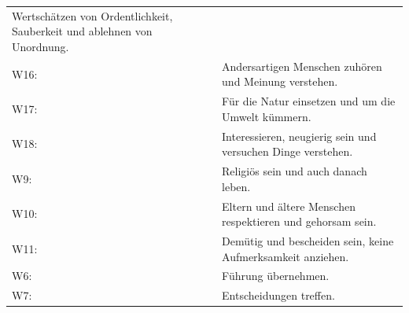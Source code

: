 \documentclass[12pt,ngerman,]{book}
\begin{document}
\begin{longtable}[]{@{}ll@{}}
\begin{minipage}[t]{0.86\columnwidth}
Wertschätzen von Ordentlichkeit, Sauberkeit und ablehnen von
Unordnung.\strut
\end{minipage}\tabularnewline
\begin{minipage}[t]{0.08\columnwidth}\raggedright\strut
W16:\strut
\end{minipage} & \begin{minipage}[t]{0.86\columnwidth}\raggedright\strut
Andersartigen Menschen zuhören und Meinung verstehen.\strut
\end{minipage}\tabularnewline
\begin{minipage}[t]{0.08\columnwidth}\raggedright\strut
W17:\strut
\end{minipage} & \begin{minipage}[t]{0.86\columnwidth}\raggedright\strut
Für die Natur einsetzen und um die Umwelt kümmern.\strut
\end{minipage}\tabularnewline
\begin{minipage}[t]{0.08\columnwidth}\raggedright\strut
W18:\strut
\end{minipage} & \begin{minipage}[t]{0.86\columnwidth}\raggedright\strut
Interessieren, neugierig sein und versuchen Dinge verstehen.\strut
\end{minipage}\tabularnewline
\begin{minipage}[t]{0.08\columnwidth}\raggedright\strut
W9:\strut
\end{minipage} & \begin{minipage}[t]{0.86\columnwidth}\raggedright\strut
Religiös sein und auch danach leben.\strut
\end{minipage}\tabularnewline
\begin{minipage}[t]{0.08\columnwidth}\raggedright\strut
W10:\strut
\end{minipage} & \begin{minipage}[t]{0.86\columnwidth}\raggedright\strut
Eltern und ältere Menschen respektieren und gehorsam sein.\strut
\end{minipage}\tabularnewline
\begin{minipage}[t]{0.08\columnwidth}\raggedright\strut
W11:\strut
\end{minipage} & \begin{minipage}[t]{0.86\columnwidth}\raggedright\strut
Demütig und bescheiden sein, keine Aufmerksamkeit anziehen.\strut
\end{minipage}\tabularnewline
\begin{minipage}[t]{0.08\columnwidth}\raggedright\strut
W6:\strut
\end{minipage} & \begin{minipage}[t]{0.86\columnwidth}\raggedright\strut
Führung übernehmen.\strut
\end{minipage}\tabularnewline
\begin{minipage}[t]{0.08\columnwidth}\raggedright\strut
W7:\strut
\end{minipage} & \begin{minipage}[t]{0.86\columnwidth}\raggedright\strut
Entscheidungen treffen.\strut
\end{minipage}\tabularnewline
\bottomrule
\end{longtable}
\end{document}
